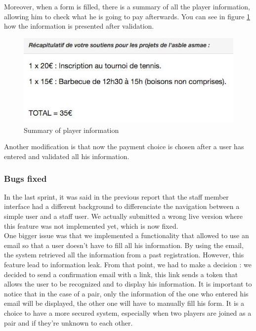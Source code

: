 \documentclass[a4paper, 12pt]{article}
\begin{document}
Moreover, when a form is filled, there is a summary of all the player information, allowing him to check what he is going to pay afterwards. You can see in figure \ref{recap} how the information is presented after validation.

\begin{figure}[h]
  \caption{\label{recap} Summary of player information}
  \includegraphics[scale=0.7]{recap.png}
\end{figure}

Another modification is that now the payment choice is chosen after a user has entered and validated all his information.
\subsubsection*{Bugs fixed}
In the last sprint, it was said in the previous report that the staff member interface had a different background to differenciate the navigation between a simple user and a staff user. We actually submitted a wrong live version where this feature was not implemented yet, which is now fixed.\\

One bigger issue was that we implemented a functionality that allowed to use an email so that a user doesn't have to fill all his information. By using the email, the system retrieved all the information from a past registration. However, this feature lead to information leak. From that point, we had to make a decision : we decided to send a confirmation email with a link, this link sends a token that allows the user to be recognized and to display his information. It is important to notice that in the case of a pair, only the information of the one who entered his email will be displayed, the other one will have to manually fill his form. It is a choice to have a more secured system, especially when two players are joined as a pair and if they're unknown to each other.\\
\end{document}
